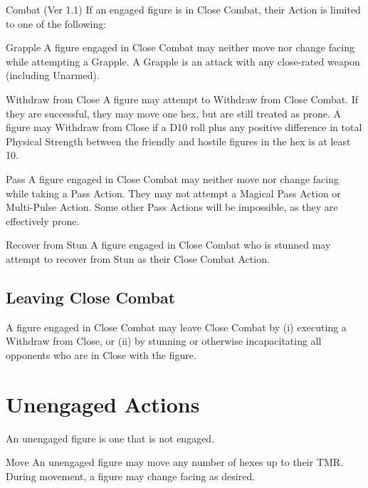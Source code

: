\begin{Chapter}{Combat (Ver 1.1)}
If an engaged figure is in Close Combat, their Action is limited to
one of the following:

\begin{Description}

\item[Grapple] A figure engaged in Close Combat may neither move nor
  change facing while attempting a Grapple.  A Grapple is an attack
  with any close-rated weapon (including Unarmed).

\item[Withdraw from Close] A figure may attempt to Withdraw from Close
  Combat. If they are successful, they may move one hex, but are still
  treated as prone.  A figure may Withdraw from Close if a D10 roll
  plus any positive difference in total Physical Strength between the
  friendly and hostile figures in the hex is at least 10.

\item[Pass] A figure engaged in Close Combat may neither move nor
  change facing while taking a Pass Action.  They may not attempt a
  Magical Pass Action or Multi-Pulse Action.  Some other Pass Actions
  will be impossible, as they are effectively prone.

\item[Recover from Stun] A figure engaged in Close Combat who is
  stunned may attempt to recover from Stun as their Close Combat
  Action.

\end{Description}

\subsection{Leaving Close Combat}

A figure engaged in Close Combat may leave Close Combat by (i)
executing a Withdraw from Close, or (ii) by stunning or otherwise
incapacitating all opponents who are in Close with the figure.

\section{Unengaged Actions}
\label{combat:unengaged}

An unengaged figure is one that is not engaged. 

\begin{Description}

\item[Move] An unengaged figure may move any number of hexes up to
  their TMR. During movement, a figure may change facing as desired.


\end{Description}
\end{Chapter}
